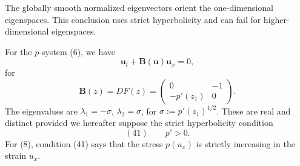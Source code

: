 \begin{remark}
\label{rem:global-orientation-eigenspaces}
The globally smooth normalized eigenvectors orient the one-dimensional eigenspaces. This conclusion uses strict hyperbolicity and can fail for higher-dimensional eigenspaces.
\end{remark}

\begin{example}
\label{ex:p-system-strict-hyperbolicity}
For the $p$-system (6), we have
$$\mathbf{u}_t + \mathbf{B}(\mathbf{u})\mathbf{u}_x = 0,$$
for
$$\mathbf{B}(z) = DF(z) = \begin{pmatrix} 0 & -1 \\ -p'(z_1) & 0 \end{pmatrix}.$$
The eigenvalues are $\lambda_1=-\sigma$, $\lambda_2=\sigma$, for $\sigma:=p'(z_1)^{1/2}$. These are real and distinct provided we hereafter suppose the strict hyperbolicity condition
$$(41) \qquad p'>0.$$
For (8), condition (41) says that the stress $p(u_x)$ is strictly increasing in the strain $u_x$.
\end{example}

